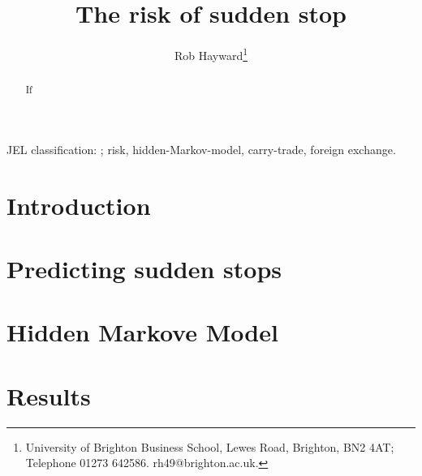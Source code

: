 \documentclass[preprint,12pt,authoryear]{elsarticle}
\begin{document}
\begin{frontmatter}
\title{The risk of sudden stop}
\author{Rob Hayward\footnote{University of Brighton Business School, Lewes Road, Brighton, BN2 4AT; Telephone 01273 642586.  rh49@brighton.ac.uk.}}

\begin{abstract}
If       
\end{abstract}
\begin{keyword}
JEL classification: ; risk, hidden-Markov-model, carry-trade, foreign exchange.
\end{keyword}

\end{frontmatter}
\section*{Introduction}
\section*{Predicting sudden stops}
\section*{Hidden Markove Model}
\section*{Results}
\end{document}

